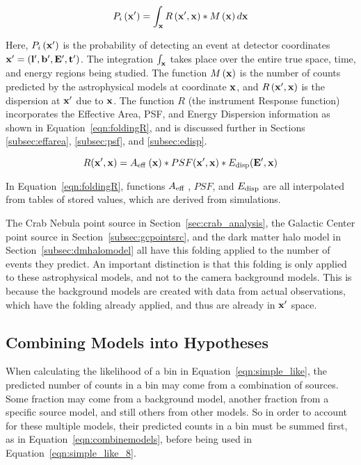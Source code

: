   \begin{equation}\label{eqn:folding}
    P_i \left( \mathbf{x'} \right ) = \int_{\mathbf{x }} R \left ( \mathbf{x'}, \mathbf{x } \right ) * M \left ( \mathbf{x } \right ) d\mathbf{x }
  \end{equation}
  
  Here, $P_i \left( \mathbf{x'} \right )$ is the probability of detecting an event at detector coordinates $\mathbf{x'} = \left ( \mathbf{l'}, \mathbf{b'}, \mathbf{E'}, \mathbf{t'} \right )$.
  The integration $\int_{\mathbf{x }}$ takes place over the entire true space, time, and energy regions being studied.
  The function $M\left ( \mathbf{x } \right )$ is the number of counts predicted by the astrophysical models at coordinate $\mathbf{x }$, and $R \left ( \mathbf{x'}, \mathbf{x } \right )$ is the dispersion at $\mathbf{x'}$ due to $\mathbf{x }$.
  The function $R$ (the instrument Response function) incorporates the Effective Area, PSF, and Energy Dispersion information as shown in Equation~\ref{eqn:foldingR}, and is discussed further in Sections \ref{subsec:effarea}, \ref{subsec:psf}, and \ref{subsec:edisp}.
  
  \begin{equation}\label{eqn:foldingR}
    R(\mathbf{x'},\mathbf{x }) = A_\textrm{eff }(\mathbf{x }) * PSF(\mathbf{x'},\mathbf{x }) * E_\textrm{disp}(\mathbf{E'},\mathbf{x })
  \end{equation}
  
  In Equation~\ref{eqn:foldingR}, functions $A_\textrm{eff }$, $PSF$, and $E_\textrm{disp}$ are all interpolated from tables of stored values, which are derived from simulations.

  The Crab Nebula point source in Section~\ref{sec:crab_analysis}, the Galactic Center point source in Section~\ref{subsec:gcpointsrc}, and the dark matter halo model in Section~\ref{subsec:dmhalomodel} all have this folding applied to the number of events they predict.
  An important distinction is that this folding is only applied to these astrophysical models, and not to the camera background models.
  This is because the background models are created with data from actual observations, which have the folding already applied, and thus are already in $\mathbf{x'}$ space.
  
  \subsection{Combining Models into Hypotheses}\label{subsec:hypotheses}
  
  When calculating the likelihood of a bin in Equation~\ref{eqn:simple_like}, the predicted number of counts in a bin may come from a combination of sources.
  Some fraction may come from a background model, another fraction from a specific source model, and still others from other models.
  So in order to account for these multiple models, their predicted counts in a bin must be summed first, as in Equation~\ref{eqn:combinemodels}, before being used in Equation~\ref{eqn:simple_like_8}.
  
